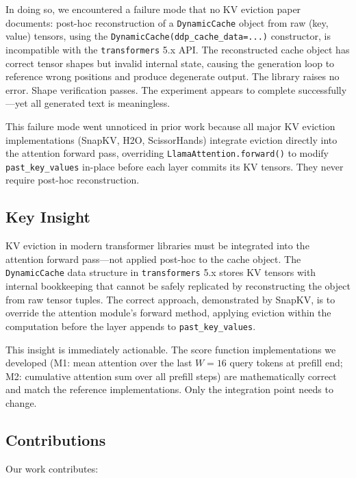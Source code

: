 In doing so, we encountered a failure mode that no KV eviction paper documents: post-hoc reconstruction of a \texttt{DynamicCache} object from raw (key, value) tensors, using the \texttt{DynamicCache(ddp\_cache\_data=...)} constructor, is incompatible with the \texttt{transformers} 5.x API. The reconstructed cache object has correct tensor shapes but invalid internal state, causing the generation loop to reference wrong positions and produce degenerate output. The library raises no error. Shape verification passes. The experiment appears to complete successfully---yet all generated text is meaningless.

This failure mode went unnoticed in prior work because all major KV eviction implementations (SnapKV, H2O, ScissorHands) integrate eviction directly into the attention forward pass, overriding \texttt{LlamaAttention.forward()} to modify \texttt{past\_key\_values} in-place before each layer commits its KV tensors. They never require post-hoc reconstruction.

\subsection{Key Insight}

KV eviction in modern transformer libraries must be integrated into the attention forward pass---not applied post-hoc to the cache object. The \texttt{DynamicCache} data structure in \texttt{transformers} 5.x stores KV tensors with internal bookkeeping that cannot be safely replicated by reconstructing the object from raw tensor tuples. The correct approach, demonstrated by SnapKV, is to override the attention module's forward method, applying eviction within the computation before the layer appends to \texttt{past\_key\_values}.

This insight is immediately actionable. The score function implementations we developed (M1: mean attention over the last $W=16$ query tokens at prefill end; M2: cumulative attention sum over all prefill steps) are mathematically correct and match the reference implementations. Only the integration point needs to change.

\subsection{Contributions}

Our work contributes:

